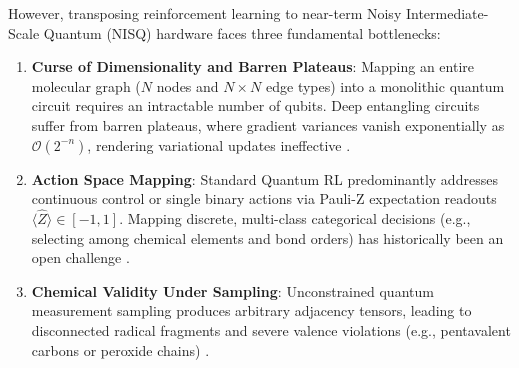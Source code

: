 \documentclass[conference]{IEEEtran}
\begin{document}
However, transposing reinforcement learning to near-term Noisy Intermediate-Scale Quantum (NISQ) hardware faces three fundamental bottlenecks:
\begin{enumerate}
    \item \textbf{Curse of Dimensionality and Barren Plateaus}: Mapping an entire molecular graph ($N$ nodes and $N \times N$ edge types) into a monolithic quantum circuit requires an intractable number of qubits. Deep entangling circuits suffer from barren plateaus, where gradient variances vanish exponentially as $\mathcal{O}(2^{-n})$, rendering variational updates ineffective \cite{mcclean2018barren,dunjko2016quantum}.
    \item \textbf{Action Space Mapping}: Standard Quantum RL predominantly addresses continuous control or single binary actions via Pauli-Z expectation readouts $\langle \hat{Z} \rangle \in [-1, 1]$. Mapping discrete, multi-class categorical decisions (e.g., selecting among chemical elements and bond orders) has historically been an open challenge \cite{jerbi2021parametrized,chen2022variational}.
    \item \textbf{Chemical Validity Under Sampling}: Unconstrained quantum measurement sampling produces arbitrary adjacency tensors, leading to disconnected radical fragments and severe valence violations (e.g., pentavalent carbons or peroxide chains) \cite{decao2018molgan}.
\end{enumerate}
\end{document}
